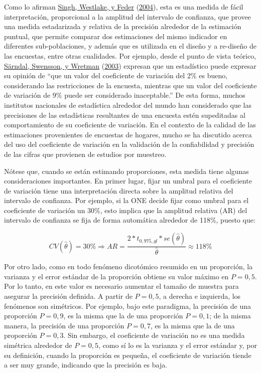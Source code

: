 \documentclass[
  12pt,
  spanish,
]{book}
\begin{document}
Como lo afirman \protect\hyperlink{ref-Singh_Westlake_Feder_2004}{Singh, Westlake, y Feder} (\protect\hyperlink{ref-Singh_Westlake_Feder_2004}{2004}), esta es una medida de fácil interpretación, proporcional a la amplitud del intervalo de confianza, que provee una medida estadarizada y relativa de la precisión alrededor de la estimación puntual, que permite comparar dos estimaciones del mismo indicador en diferentes sub-poblaciones, y además que es utilizada en el diseño y a re-diseño de las encuestas, entre otras cualidades. Por ejemplo, desde el punto de vista teórico, \protect\hyperlink{ref-Sarndal_Swensson_Wretman_2003}{Särndal, Swensson, y Wretman} (\protect\hyperlink{ref-Sarndal_Swensson_Wretman_2003}{2003}) expresan que un estadístico puede expresar su opinión de ``que un valor del coeficiente de variación del 2\% es bueno, considerando las restricciones de la encuesta, mientras que un valor del coeficiente de variación de 9\% puede ser considerado inaceptable.'' De esta forma, muchos institutos nacionales de estadística alrededor del mundo han considerado que las precisiones de las estadísticas resultantes de una encuesta estén supeditadas al comportamiento de su coeficiente de variación. En el contexto de la calidad de las estimaciones provenientes de encuestas de hogares, mucho se ha discutido acerca del uso del coeficiente de variación en la validación de la confiabilidad y precisión de las cifras que provienen de estudios por muestreo.

Nótese que, cuando se están estimando proporciones, esta medida tiene algunas consideraciones importantes. En primer lugar, fijar un umbral para el coeficiente de variación tiene una interpretación directa sobre la amplitud relativa del intervalo de confianza. Por ejemplo, si la ONE decide fijar como umbral para el coeficiente de variación un 30\%, esto implica que la amplitud relativa (AR) del intervalo de confianza se fija de forma automática alrededor de 118\%, puesto que:

\[
CV(\hat\theta) = 30\% 
\Rightarrow 
AR = \frac{2*t_{0,975, gl} * se(\hat\theta)}{\hat\theta} \approx 118\%
\]

Por otro lado, como en todo fenómeno dicotómico resumido en un proporción, la varianza y el error estándar de la proporción obtiene su valor máximo en \(P=0,5\). Por lo tanto, en este valor es necesario aumentar el tamaño de muestra para asegurar la precisión definida. A partir de \(P=0,5\), a derecha e izquierda, los fenómenos son simétricos. Por ejemplo, bajo este paradigma, la precisión de una proporción \(P=0,9\), es la misma que la de una proporción \(P=0,1\); de la misma manera, la precisión de una proporción \(P=0,7\), es la misma que la de una proporción \(P=0,3\). Sin embargo, el coeficiente de variación no es una medida simétrica alrededor de \(P=0,5\), como sí lo es la varianza y el error estándar y, por su definición, cuando la proporción es pequeña, el coeficiente de variación tiende a ser muy grande, indicando que la precisión es baja.
\end{document}
